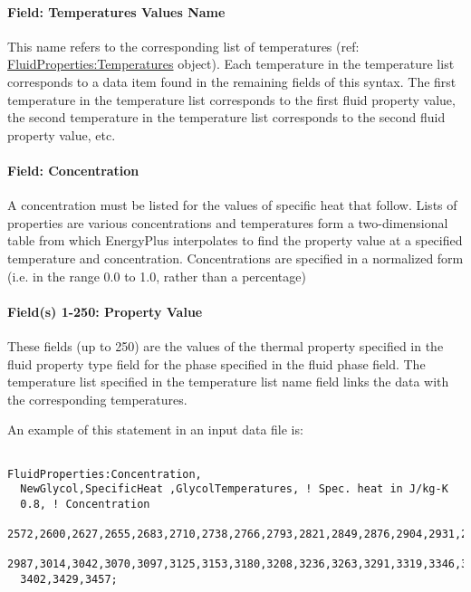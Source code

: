 \paragraph{Field: Temperatures Values Name}\label{field-temperatures-values-name-2}

This name refers to the corresponding list of temperatures (ref: \hyperref[fluidpropertiestemperatures]{FluidProperties:Temperatures} object). Each temperature in the temperature list corresponds to a data item found in the remaining fields of this syntax. The first temperature in the temperature list corresponds to the first fluid property value, the second temperature in the temperature list corresponds to the second fluid property value, etc.

\paragraph{Field: Concentration}\label{field-concentration}

A concentration must be listed for the values of specific heat that follow. Lists of properties are various concentrations and temperatures form a two-dimensional table from which EnergyPlus interpolates to find the property value at a specified temperature and concentration. Concentrations are specified in a normalized form (i.e. in the range 0.0 to 1.0, rather than a percentage)

\paragraph{Field(s) 1-250: Property Value}\label{fields-1-250-property-value-2}

These fields (up to 250) are the values of the thermal property specified in the fluid property type field for the phase specified in the fluid phase field. The temperature list specified in the temperature list name field links the data with the corresponding temperatures.

An example of this statement in an input data file is:

\begin{lstlisting}

FluidProperties:Concentration,
  NewGlycol,SpecificHeat ,GlycolTemperatures, ! Spec. heat in J/kg-K
  0.8, ! Concentration
  2572,2600,2627,2655,2683,2710,2738,2766,2793,2821,2849,2876,2904,2931,2959,
  2987,3014,3042,3070,3097,3125,3153,3180,3208,3236,3263,3291,3319,3346,3374,
  3402,3429,3457;
\end{lstlisting}
